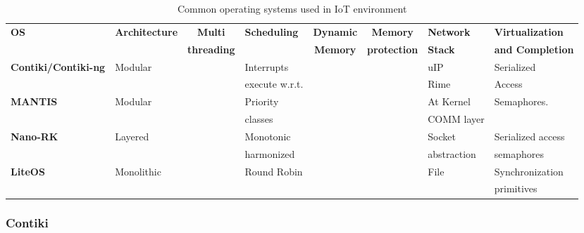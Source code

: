 \begin{table}[h!]
\scriptsize
\begin{tabular}{l|l|c|l|c|c|l|l} %
	\bf{OS}      & \bf{Architecture} & \bf{Multi}     & \bf{Scheduling} & \bf{Dynamic}    & \bf{Memory}     & \bf{Network}  & \bf{Virtualization} \\
	\            &                   & \bf{threading} &                 & \bf{Memory}     & \bf{protection} & \bf{Stack} & \bf{and Completion}   \\\hline
	\bf{Contiki/Contiki-ng} & Modular& \ok            & Interrupts      & \ok             & \ko             & uIP          & Serialized          \\
	\            &                   &                & execute w.r.t.  &                 &                 & Rime         & Access              \\\hline
	\bf{MANTIS}  & Modular           & \ko            & Priority        & \ok             & \ko             & At Kernel    & Semaphores.         \\
	\            &                   &                & classes         &                 &                 & COMM layer   &                     \\\hline
	\bf{Nano-RK} & Layered           & \ok            & Monotonic       & \ko             & \ko             & Socket       & Serialized access   \\
	\            &                   &                & harmonized      &                 &                 & abstraction  & semaphores          \\\hline
	\bf{LiteOS}  & Monolithic        & \ok            & Round Robin     & \ok             & \ok             & File         & Synchronization     \\
	\            &                   &                &                 &                 &                 &              & primitives          \\\hline
\end{tabular}
\caption{\label{tab:OS} Common operating systems used in IoT environment \cite{al-fuqaha_internet_24}}
\end{table}

\subsubsection{Contiki}


